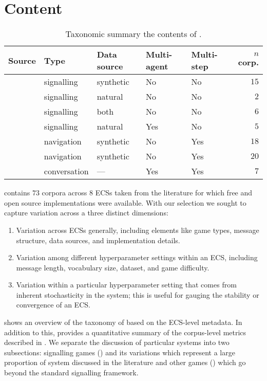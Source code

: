 \section{Content}
\unskip\label{elcc:sec:content}

\begin{table}
  \centering
  \begin{tabular}{lllllr}
    \toprule
    Source & Type & Data source & Multi-agent & Multi-step & $n$ corp. \\
    \midrule
    \citet{egg}                       & signalling   & synthetic & No & No & $15$ \\
    \citet{yao2022linking}            & signalling   & natural   & No & No & $2$ \\
    \citet{mu2021generalizations}     & signalling   & both      & No & No & $6$ \\
    \citet{chaabouni2022emergent}     & signalling   & natural   & Yes & No & $5$ \\
    \citet{unger2020GeneralizingEC}   & navigation   & synthetic & No & Yes & $18$ \\
    \citet{boldt2022MathematicallyMT} & navigation   & synthetic & No & Yes & $20$ \\
    \citet{brandizzi2022rlupus}       & conversation & ---       & Yes & Yes & $7$ \\
    \bottomrule
  \end{tabular}
  \medskip
  \caption{Taxonomic summary the contents of \theLib{}.}
  \unskip\label{tab:tax-sum}
\end{table}


\theLib{} contains $73$ corpora across $8$ ECSs taken from the literature for which free and open source implementations were available.
With our selection we sought to capture variation across a three distinct dimensions:
\begin{enumerate}
  \item Variation across ECSs generally, including elements like game types, message structure, data sources, and implementation details.
  \item Variation among different hyperparameter settings within an ECS, including message length, vocabulary size, dataset, and game difficulty.
  \item Variation within a particular hyperparameter setting that comes from inherent stochasticity in the system; this is useful for gauging the stability or convergence of an ECS\@.
\end{enumerate}
 shows an overview of the taxonomy of \theLib{} based on the ECS-level metadata.
In addition to this,  provides a quantitative summary of the corpus-level metrics described in .
We separate the discussion of particular systems into two subsections: signalling games () and its variations which represent a large proportion of system discussed in the literature and other games () which go beyond the standard signalling framework.


